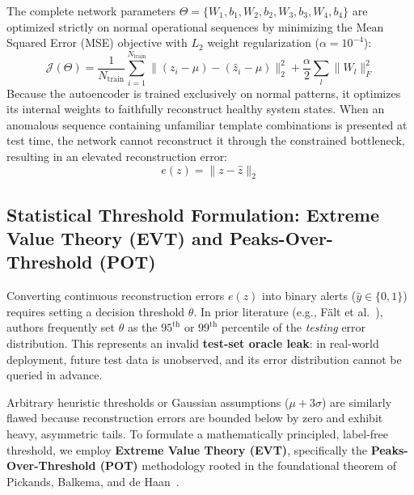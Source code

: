The complete network parameters $\Theta = \{W_1, b_1, W_2, b_2, W_3, b_3, W_4, b_4\}$ are optimized strictly on normal operational sequences by minimizing the Mean Squared Error (MSE) objective with $L_2$ weight regularization ($\alpha = 10^{-4}$):
\begin{equation}
    \mathcal{J}(\Theta) = \frac{1}{N_{\text{train}}} \sum_{i=1}^{N_{\text{train}}} \| (z_i - \mu) - (\hat{z}_i - \mu) \|_2^2 + \frac{\alpha}{2} \sum_{l} \|W_l\|_F^2
\end{equation}
Because the autoencoder is trained exclusively on normal patterns, it optimizes its internal weights to faithfully reconstruct healthy system states. When an anomalous sequence containing unfamiliar template combinations is presented at test time, the network cannot reconstruct it through the constrained bottleneck, resulting in an elevated reconstruction error:
\begin{equation}
    e(z) = \| z - \hat{z} \|_2
\end{equation}

\subsection{Statistical Threshold Formulation: Extreme Value Theory (EVT) and Peaks-Over-Threshold (POT)}
\label{subsec:evt_pot_foundations}
Converting continuous reconstruction errors $e(z)$ into binary alerts ($\hat{y} \in \{0, 1\}$) requires setting a decision threshold $\theta$. In prior literature (e.g., F{\"a}lt et al.~\cite{falt2025lightweight}), authors frequently set $\theta$ as the $95^{\text{th}}$ or $99^{\text{th}}$ percentile of the \textit{testing} error distribution. This represents an invalid \textbf{test-set oracle leak}: in real-world deployment, future test data is unobserved, and its error distribution cannot be queried in advance.

Arbitrary heuristic thresholds or Gaussian assumptions ($\mu + 3\sigma$) are similarly flawed because reconstruction errors are bounded below by zero and exhibit heavy, asymmetric tails. To formulate a mathematically principled, label-free threshold, we employ \textbf{Extreme Value Theory (EVT)}, specifically the \textbf{Peaks-Over-Threshold (POT)} methodology rooted in the foundational theorem of Pickands, Balkema, and de Haan~\cite{pickands1975statistical, balkema1974residual}.

